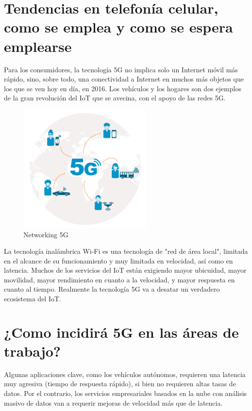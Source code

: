 \documentclass[]{article}
\begin{document}
\section{Tendencias en telefonía celular, como se emplea y como se espera emplearse}

Para los consumidores, la tecnología 5G no implica solo un
Internet móvil más rápido, sino, sobre todo, una conectividad
a Internet en muchos más objetos que los que se ven hoy en
día, en 2016. Los vehículos y los hogares son dos ejemplos de
la gran revolución del IoT que se avecina, con el apoyo de las
redes 5G.\\

\begin{figure}[h!]
	\centering
	\includegraphics[width=0.6\textwidth]{Imagenes/5Gapp.png}
	\caption{Networking 5G}
	\label{fig:5Gapp}
\end{figure}

La tecnología inalámbrica Wi-Fi es una tecnología de "red de
área local", limitada en el alcance de su funcionamiento y muy
limitada en velocidad, así como en latencia. Muchos de los
servicios del IoT están exigiendo mayor ubicuidad, mayor
movilidad, mayor rendimiento en cuanto a la velocidad, y mayor
respuesta en cuanto al tiempo. Realmente la tecnología 5G va a
desatar un verdadero ecosistema del IoT.\\


\section{¿Como incidirá 5G en las áreas de trabajo?}


Algunas aplicaciones clave, como los vehículos autónomos,
requieren una latencia muy agresiva (tiempo de respuesta
rápido), si bien no requieren altas tasas de datos.
Por el contrario, los servicios empresariales basados en la
nube con análisis masivo de datos van a requerir mejoras de
velocidad más que de latencia.\\
\end{document}
